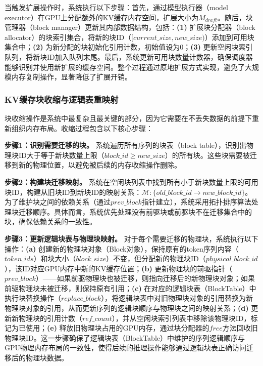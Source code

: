     当触发扩展操作时，系统执行以下步骤：首先，通过模型执行器（model executor）在GPU上分配额外的KV缓存内存空间，扩展大小为$M_{draft}$。随后，块管理器（block manager）更新其内部数据结构，包括：\textbf{(1)} 扩展块分配器（block allocator）的块索引集合，将新的块ID（$[current\_size, new\_size)$）添加到可用块集合中；\textbf{(2)} 为新分配的块初始化引用计数，初始值设为0；\textbf{(3)} 更新空闲块索引队列，将新块ID加入队列末尾。最后，系统更新可用块数量计数器，确保调度器能够识别并使用新扩展的缓存空间。整个过程通过原地扩展方式实现，避免了大规模内存复制操作，显著降低了扩展开销。
    
    \subsubsection{KV缓存块收缩与逻辑表重映射}
    
    块收缩操作是系统中最复杂且最关键的部分，因为它需要在不丢失数据的前提下重新组织内存布局。收缩过程包含以下核心步骤：
    
    \textbf{步骤1：识别需要迁移的块。} 系统遍历所有序列的块表（block table），识别出物理块ID大于等于新块数量上限（$block\_id \geq new\_size$）的所有块。这些块需要被迁移到新的物理位置，以避免被后续的内存收缩操作删除。
    
    \textbf{步骤2：构建块迁移映射。} 系统在空闲块列表中找到所有小于新块数量上限的可用块ID，构建从旧块ID到新块ID的映射关系：$\mathcal{M}: \{old\_block\_id \rightarrow new\_block\_id\}$。为了维护块之间的依赖关系（通过$prev\_block$指针建立），系统采用拓扑排序算法处理块迁移顺序。具体而言，系统优先处理没有前驱块或前驱块不在迁移集合中的块，确保依赖关系的一致性。
    
    \textbf{步骤3：更新逻辑块表与物理块映射。} 对于每个需要迁移的物理块，系统执行以下操作：\textbf{(a)} 创建新的物理块对象（Block对象），保持原有的token序列内容（$token\_ids$）和块大小（$block\_size$）不变，但分配新的物理块ID（$physical\_block\_id$），该ID对应GPU内存中新的KV缓存位置；\textbf{(b)} 更新物理块的前驱指针（$prev\_block$）——如果前驱物理块也被迁移，则指向迁移后的新物理块对象；如果前驱物理块未被迁移，则保持原有引用；\textbf{(c)} 在对应的逻辑块表（BlockTable）中执行块替换操作（$replace\_block$），将逻辑块表中对旧物理块对象的引用替换为新物理块对象的引用，从而更新序列的逻辑块顺序与物理块之间的映射关系；\textbf{(d)} 更新新物理块的引用计数（$ref\_count$），并从空闲块索引列表中移除该物理块ID，标记为已使用；\textbf{(e)} 释放旧物理块占用的GPU内存，通过块分配器的$free$方法回收旧物理块ID。这一步骤确保了逻辑块表（BlockTable）中维护的序列逻辑顺序与GPU物理内存布局的一致性，使得后续的推理操作能够通过逻辑块表正确访问迁移后的物理块数据。
    
